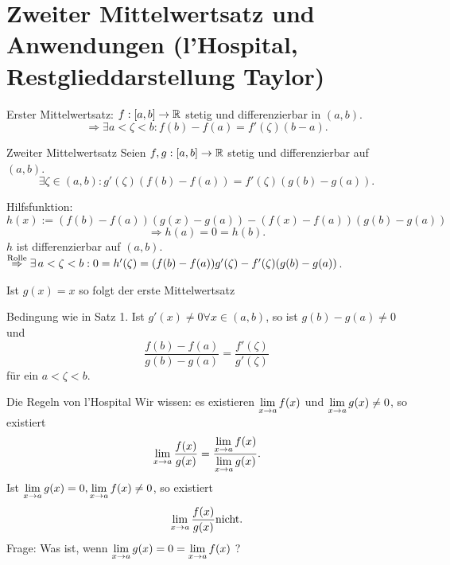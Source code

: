 \documentclass[../ana2.tex]{subfiles}
\begin{document}
\setcounter{section}{1}
\section{Zweiter Mittelwertsatz und Anwendungen (l'Hospital, Restglieddarstellung Taylor)}

Erster Mittelwertsatz: \( f: [a,b] \rightarrow \mathbb{R} \) 
stetig und differenzierbar in \( (a,b) \).
\[ \Rightarrow \exists a < \zeta < b : 
f(b) - f(a) = f'(\zeta)(b-a). \]
\begin{satz}{Zweiter Mittelwertsatz}
    Seien \(f,g:[a,b]\rightarrow \mathbb{R} \) stetig und 
    differenzierbar auf \( (a,b) \).
    \[ \exists \zeta \in (a,b): g'(\zeta)(f(b) - f(a)) 
    = f'(\zeta) (g(b) - g(a)). \]
\end{satz}
\begin{bew}
    Hilfsfunktion: 
    \[ h(x) := (f(b) - f(a))(g(x) - g(a)) 
    - (f(x) - f(a))(g(b) - g(a)) \]
    \[ \Rightarrow h(a) = 0 = h(b). \]
    \( h \) ist differenzierbar auf \( (a,b) \).
    \( \oversett{Rolle}{\Rightarrow} 
    \exists a < \zeta < b : 0 = h'(\zeta) 
    = (f(b) - f(a))g'(\zeta) - f'(\zeta)(g(b) - g(a)) \).
\end{bew}
\begin{bem}
    Ist \( g(x) = x \) so folgt der erste Mittelwertsatz
\end{bem}
\begin{kor}
    Bedingung wie in Satz 1. 
    Ist \( g'(x) \neq 0 \forall x\in (a,b) \), 
    so ist \( g(b) - g(a) \neq 0 \) und 
    \[ \frac{f(b)-f(a)}{g(b)-g(a)} 
    = \frac{f'(\zeta)}{g'(\zeta)} \]
    für ein \( a < \zeta < b \).
\end{kor}
\large{Die Regeln von l'Hospital}
Wir wissen: es existieren \( \lim\limits_{x\rightarrow{}a} f(x) \) und 
\( \lim\limits_{x\rightarrow{}a} g(x) \neq 0 \), so existiert 
\[ \lim\limits_{x\rightarrow{}a} \frac{f(x)}{g(x)} 
= \frac{ \lim\limits_{x\rightarrow{}a}f(x) }{ \lim\limits_{x\rightarrow{}a}g(x) }. \]
Ist \( \lim\limits_{x\rightarrow{}a} g(x) = 0, \lim\limits_{x\rightarrow{}a} f(x) \neq 0 \), 
so existiert
\[ \lim\limits_{x\rightarrow{}a} \frac{f(x)}{g(x)} \text{nicht.} \]
Frage: Was ist, wenn \( \lim\limits_{x\rightarrow{}a}g(x) = 0 = \lim\limits_{x\rightarrow{}a}f(x) \) ?
\end{document}

